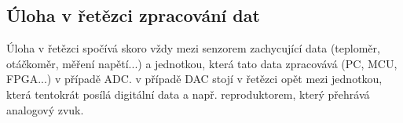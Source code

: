 \subsection{Úloha v řetězci zpracování dat}
Úloha v řetězci spočívá skoro vždy mezi senzorem zachycující data (teploměr, otáčkoměr, měření napětí...) a jednotkou, která tato data zpracovává (PC, MCU, FPGA...) v případě ADC. v případě DAC stojí v řetězci opět mezi jednotkou, která tentokrát posílá digitální data a např. reproduktorem, který přehrává analogový zvuk.






